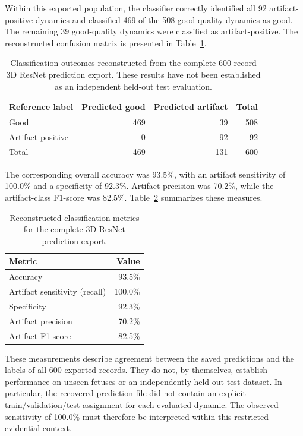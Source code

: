 Within this exported population, the classifier correctly identified all 92 artifact-positive dynamics and classified 469 of the 508 good-quality dynamics as good. The remaining 39 good-quality dynamics were classified as artifact-positive. The reconstructed confusion matrix is presented in Table~\ref{tab:3d_resnet_full_export_confusion}.

\begin{table}[htbp]
\centering
\caption{Classification outcomes reconstructed from the complete 600-record 3D ResNet prediction export. These results have not been established as an independent held-out test evaluation.}
\label{tab:3d_resnet_full_export_confusion}
\begin{tabular}{lrrr}
\hline
Reference label & Predicted good & Predicted artifact & Total \\
\hline
Good & 469 & 39 & 508 \\
Artifact-positive & 0 & 92 & 92 \\
\hline
Total & 469 & 131 & 600 \\
\hline
\end{tabular}
\end{table}

The corresponding overall accuracy was 93.5\%, with an artifact sensitivity of 100.0\% and a specificity of 92.3\%. Artifact precision was 70.2\%, while the artifact-class F1-score was 82.5\%. Table~\ref{tab:3d_resnet_full_export_metrics} summarizes these measures.

\begin{table}[htbp]
\centering
\caption{Reconstructed classification metrics for the complete 3D ResNet prediction export.}
\label{tab:3d_resnet_full_export_metrics}
\begin{tabular}{lr}
\hline
Metric & Value \\
\hline
Accuracy & 93.5\% \\
Artifact sensitivity (recall) & 100.0\% \\
Specificity & 92.3\% \\
Artifact precision & 70.2\% \\
Artifact F1-score & 82.5\% \\
\hline
\end{tabular}
\end{table}

These measurements describe agreement between the saved predictions and the labels of all 600 exported records. They do not, by themselves, establish performance on unseen fetuses or an independently held-out test dataset. In particular, the recovered prediction file did not contain an explicit train/validation/test assignment for each evaluated dynamic. The observed sensitivity of 100.0\% must therefore be interpreted within this restricted evidential context.

